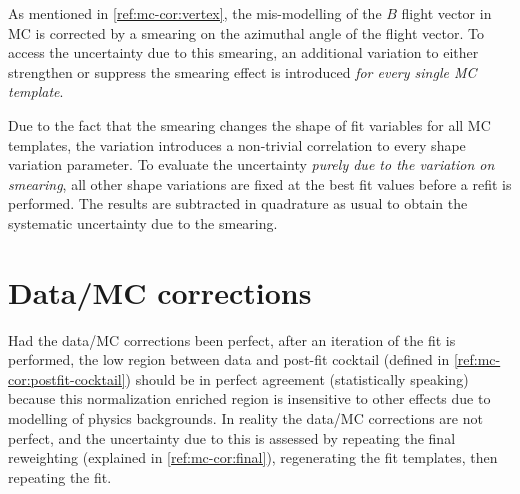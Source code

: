 As mentioned in \cref{ref:mc-cor:vertex},
the mis-modelling of the $B$ flight vector in MC is corrected by a smearing
on the azimuthal angle of the flight vector.
To access the uncertainty due to this smearing, an additional
variation to either strengthen or suppress the smearing effect is introduced
\emph{for every single MC template}.

Due to the fact that the smearing changes the shape of fit variables for all
MC templates, the variation introduces a non-trivial correlation to every
shape variation parameter.
To evaluate the uncertainty \emph{purely due to the variation on smearing},
all other shape variations are fixed at the best fit values before a refit is
performed.
The results are subtracted in quadrature as usual to obtain the systematic
uncertainty due to the smearing.


\section{Data/MC corrections}
\label{sys-cor-rwt}

Had the data/MC corrections been perfect,
after an iteration of the fit is performed,
the low \mmSq region between data and post-fit cocktail
(defined in \cref{ref:mc-cor:postfit-cocktail}) should be in perfect agreement
(statistically speaking)
because this normalization enriched region is insensitive to other effects
due to modelling of physics backgrounds.
In reality the data/MC corrections are not perfect,
and the uncertainty due to this is assessed by repeating
the final reweighting (explained in \cref{ref:mc-cor:final}),
regenerating the fit templates,
then repeating the fit.
